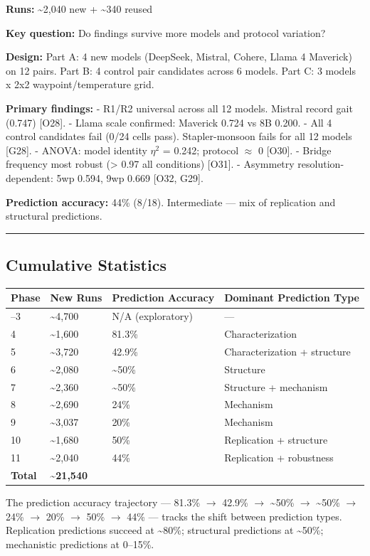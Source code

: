 \textbf{Runs:} \textasciitilde2,040 new + \textasciitilde340 reused

\textbf{Key question:} Do findings survive more models and protocol variation?

\textbf{Design:} Part A: 4 new models (DeepSeek, Mistral, Cohere, Llama 4 Maverick) on 12 pairs. Part B: 4 control pair candidates across 6 models. Part C: 3 models x 2x2 waypoint/temperature grid.

\textbf{Primary findings:} - R1/R2 universal across all 12 models. Mistral record gait (0.747) {[}O28{]}. - Llama scale confirmed: Maverick 0.724 vs 8B 0.200. - All 4 control candidates fail (0/24 cells pass). Stapler-monsoon fails for all 12 models {[}G28{]}. - ANOVA: model identity \(\eta^2\) = 0.242; protocol \(\approx\) 0 {[}O30{]}. - Bridge frequency most robust (\textgreater{} 0.97 all conditions) {[}O31{]}. - Asymmetry resolution-dependent: 5wp 0.594, 9wp 0.669 {[}O32, G29{]}.

\textbf{Prediction accuracy:} 44\% (8/18). Intermediate --- mix of replication and structural predictions.

\begin{center}\rule{0.5\linewidth}{0.5pt}\end{center}

\subsection{Cumulative Statistics}\label{cumulative-statistics}

\begin{longtable}[]{@{}llll@{}}
\toprule\noalign{}
Phase & New Runs & Prediction Accuracy & Dominant Prediction Type \\
\midrule\noalign{}
\endhead
\bottomrule\noalign{}
\endlastfoot
1--3 & \textasciitilde4,700 & N/A (exploratory) & --- \\
4 & \textasciitilde1,600 & 81.3\% & Characterization \\
5 & \textasciitilde3,720 & 42.9\% & Characterization + structure \\
6 & \textasciitilde2,080 & \textasciitilde50\% & Structure \\
7 & \textasciitilde2,360 & \textasciitilde50\% & Structure + mechanism \\
8 & \textasciitilde2,690 & 24\% & Mechanism \\
9 & \textasciitilde3,037 & 20\% & Mechanism \\
10 & \textasciitilde1,680 & 50\% & Replication + structure \\
11 & \textasciitilde2,040 & 44\% & Replication + robustness \\
\textbf{Total} & \textbf{\textasciitilde21,540} & & \\
\end{longtable}

The prediction accuracy trajectory --- 81.3\% \(\to\) 42.9\% \(\to\) \textasciitilde50\% \(\to\) \textasciitilde50\% \(\to\) 24\% \(\to\) 20\% \(\to\) 50\% \(\to\) 44\% --- tracks the shift between prediction types. Replication predictions succeed at \textasciitilde80\%; structural predictions at \textasciitilde50\%; mechanistic predictions at 0--15\%.
